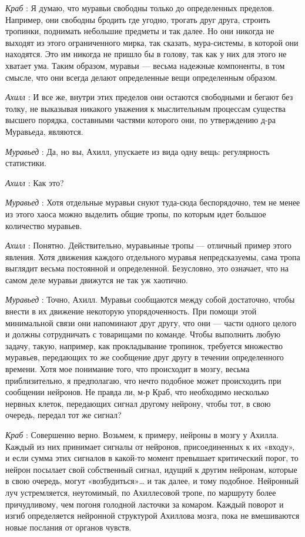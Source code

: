 \documentclass[../main.tex]{subfiles}
\begin{document}
\begin{dialogue}
\emph{Краб} : Я думаю, что муравьи свободны только до определенных пределов. Например, они свободны бродить где угодно, трогать друг друга, строить тропинки, поднимать небольшие предметы и так далее. Но они никогда не выходят из этого ограниченного мирка, так сказать, мура-системы, в которой они находятся. Это им никогда не пришло бы в голову, так как у них для этого не хватает ума. Таким образом, муравьи --- весьма надежные компоненты, в том смысле, что они всегда делают определенные вещи определенным образом.

\emph{Ахилл} : И все же, внутри этих пределов они остаются свободными и бегают без толку, не выказывая никакого уважения к мыслительным процессам существа высшего порядка, составными частями которого они, по утверждению д-ра Муравьеда, являются.

\emph{Муравьед} : Да, но вы, Ахилл, упускаете из вида одну вещь: регулярность статистики.

\emph{Ахилл} : Как это?

\emph{Муравьед} : Хотя отдельные муравьи снуют туда-сюда беспорядочно, тем не менее из этого хаоса можно выделить общие тропы, по которым идет большое количество муравьев.

\emph{Ахилл} : Понятно. Действительно, муравьиные тропы --- отличный пример этого явления. Хотя движения каждого отдельного муравья непредсказуемы, сама тропа выглядит весьма постоянной и определенной. Безусловно, это означает, что на самом деле муравьи движутся не так уж хаотично.

\emph{Муравьед} : Точно, Ахилл. Муравьи сообщаются между собой достаточно, чтобы внести в их движение некоторую упорядоченность. При помощи этой минимальной связи они напоминают друг другу, что они --- части одного целого и должны сотрудничать с товарищами по команде. Чтобы выполнить любую задачу, такую, например, как прокладывание тропинок, требуется множество муравьев, передающих то же сообщение друг другу в течении определенного времени. Хотя мое понимание того, что происходит в мозгу, весьма приблизительно, я предполагаю, что нечто подобное может происходить при сообщении нейронов. Не правда ли, м-р Краб, что необходимо несколько нервных клеток, передающих сигнал другому нейрону, чтобы тот, в свою очередь, передал тот же сигнал?

\emph{Краб} : Совершенно верно. Возьмем, к примеру, нейроны в мозгу у Ахилла. Каждый из них принимает сигналы от нейронов, присоединенных к их «входу», и если сумма этих сигналов в какой-то момент превышает критический порог, то нейрон посылает свой собственный сигнал, идущий к другим нейронам, которые в свою очередь, могут «возбудиться»\ldots{} и так далее, и тому подобное. Нейронный луч устремляется, неутомимый, по Ахиллесовой тропе, по маршруту более причудливому, чем погоня голодной ласточки за комаром. Каждый поворот и изгиб определяется нейронной структурой Ахиллова мозга, пока не вмешиваются новые послания от органов чувств.


\end{dialogue}
\end{document}
